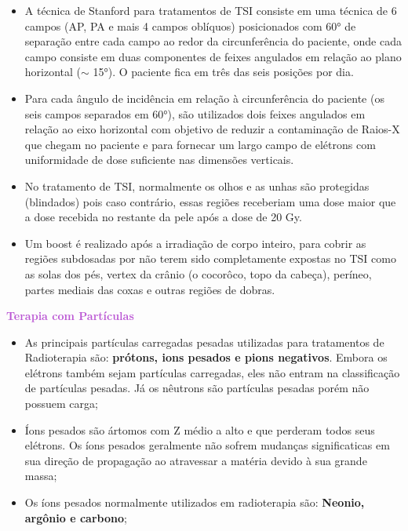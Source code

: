 \documentclass[11pt,a4paper]{article}
\newcounter{exemplo}
\begin{document}
\begin{exemplo}
\begin{itemize}
        \item A técnica de Stanford para tratamentos de TSI consiste em uma técnica de 6 campos (AP, PA e mais 4 campos oblíquos) posicionados com \ang{60} de separação entre cada campo ao redor da circunferência do paciente, onde cada campo consiste em duas componentes de feixes angulados em relação ao plano horizontal ($\sim$ \ang{15}). O paciente fica em três das seis posições por dia.
        
        \item Para cada ângulo de incidência em relação à circunferência do paciente (os seis campos separados em \ang{60}), são utilizados dois feixes angulados em relação ao eixo horizontal com objetivo de reduzir a contaminação de Raios-X que chegam no paciente e para fornecar um largo campo de elétrons com uniformidade de dose suficiente nas dimensões verticais.
        
        \item No tratamento de TSI, normalmente os olhos e as unhas são protegidas (blindados) pois caso contrário, essas regiões receberiam uma dose maior que a dose recebida no restante da pele após a dose de 20 Gy.
        
        \item Um boost é realizado após a irradiação de corpo inteiro, para cobrir as regiões subdosadas por não terem sido completamente expostas no TSI como as solas dos pés, vertex da crânio (o cocorôco, topo da cabeça), períneo, partes mediais das coxas e outras regiões de dobras. 

    \end{itemize}

    \textcolor{MediumOrchid}{\LobsterTwo\textbf{Terapia com Partículas}} 
    \begin{itemize}
        \item As principais partículas carregadas pesadas utilizadas para tratamentos de Radioterapia são: \textbf{prótons, ions pesados e pions negativos}. Embora os elétrons também sejam partículas carregadas, eles não entram na classificação de partículas pesadas.  Já os nêutrons são partículas pesadas porém não possuem carga;
        
        \item Íons pesados são ártomos com Z médio a alto e que perderam todos seus elétrons. Os íons pesados geralmente não sofrem mudanças significaticas em sua direção de propagação ao atravessar a matéria devido à sua grande massa;
        
        \item Os íons pesados normalmente utilizados em radioterapia são: \textbf{Neonio, argônio e carbono};
        

\end{itemize}
\end{exemplo}
\end{document}
